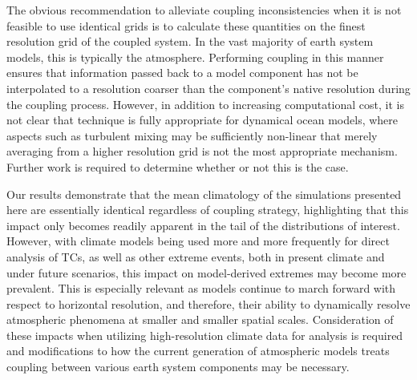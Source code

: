 \documentclass[draft,ms]{AGUTeX}
\begin{document}
\begin{article}
The obvious recommendation to alleviate coupling inconsistencies when it is not feasible to use identical grids is to calculate these quantities on the finest resolution grid of the coupled system. In the vast majority of earth system models, this is typically the atmosphere. Performing coupling in this manner ensures that information passed back to a model component has not be interpolated to a resolution coarser than the component's native resolution during the coupling process. However, in addition to increasing computational cost, it is not clear that technique is fully appropriate for dynamical ocean models, where aspects such as turbulent mixing may be sufficiently non-linear that merely averaging from a higher resolution grid is not the most appropriate mechanism. Further work is required to determine whether or not this is the case.

Our results demonstrate that the mean climatology of the simulations presented here are essentially identical regardless of coupling strategy, highlighting that this impact only becomes readily apparent in the tail of the distributions of interest. However, with climate models being used more and more frequently for direct analysis of TCs, as well as other extreme events, both in present climate and under future scenarios, this impact on model-derived extremes may become more prevalent.  This is especially relevant as models continue to march forward with respect to horizontal resolution, and therefore, their ability to dynamically resolve atmospheric phenomena at smaller and smaller spatial scales. Consideration of these impacts when utilizing high-resolution climate data for analysis is required and modifications to how the current generation of atmospheric models treats coupling between various earth system components may be necessary.






\end{article}
\end{document}
